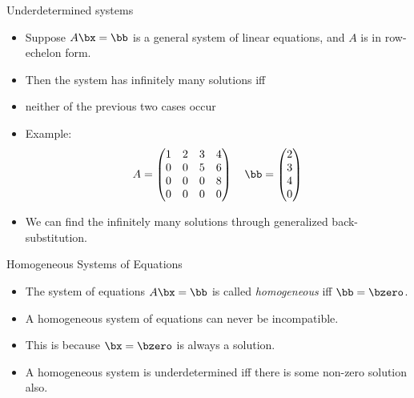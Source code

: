 \documentclass{beamer}
\begin{document}
\begin{frame}{Underdetermined systems}

\begin{itemize}
\item Suppose $A\bx=\bb$ is a general system of linear equations, and $A$ is in row-echelon form.
\item Then the system has infinitely many solutions iff
\item neither of the previous two cases occur
\item Example:
$$
A =
\begin{pmatrix}
1 & 2 & 3 & 4 \\
0 & 0 & 5 & 6 \\
0 & 0 & 0 & 8 \\
0 & 0 & 0 & 0 \\
\end{pmatrix}
\quad
\bb=
\begin{pmatrix}
2 \\ 3 \\ 4 \\ 0
\end{pmatrix}
$$
\item We can find the infinitely many solutions through generalized back-substitution.

\end{itemize}
\end{frame}

\begin{frame}{Homogeneous Systems of Equations}

\begin{itemize}
\item The system of equations $A\bx=\bb$ is called \emph{homogeneous} iff $\bb=\bzero$.
\item A homogeneous system of equations can never be incompatible.
\item This is because $\bx=\bzero$ is always a solution.
\item A homogeneous system is underdetermined iff there is some non-zero solution also.
\end{itemize}
\end{frame}
\end{document}
